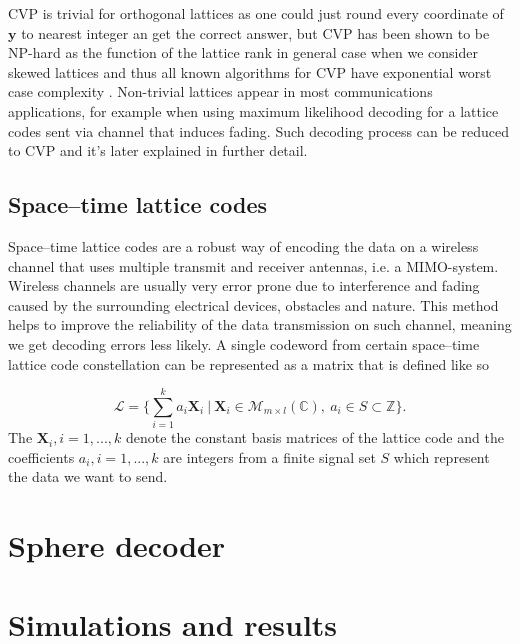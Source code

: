 \documentclass[english,12pt,a4paper,pdftex,sci,utf8]{aaltothesis}
\begin{document}
CVP is trivial for orthogonal lattices as one could just round every coordinate of $\mathbf{y}$ to nearest integer an get the correct answer, but CVP has been shown to be NP-hard as the function of the lattice rank in general case when we consider skewed lattices and thus all known algorithms for CVP have exponential worst case complexity \cite{agrell}. Non-trivial lattices appear in most communications applications, for example when using maximum likelihood decoding for a lattice codes sent via channel that induces fading. Such decoding process can be reduced to CVP and it's later explained in further detail.

\subsection{Space--time lattice codes}

Space--time lattice codes are a robust way of encoding the data on a  wireless channel that uses multiple transmit and receiver antennas, i.e. a MIMO-system. Wireless channels are usually very error prone due to interference and fading caused by the surrounding electrical devices, obstacles and nature. This method helps to improve the reliability of the data transmission on such channel, meaning we get decoding errors less likely. A single codeword from certain space--time lattice code constellation can be represented as a matrix that is defined like so

\begin{equation}
\mathcal{L} = \Bigg\{\sum_{i=1}^k a_i\mathbf{X}_i \ \Big| \ \mathbf{X}_i \in \mathcal{M}_{m \times l}(\mathbb{C}), \ a_i \in S \subset \mathbb{Z} \Bigg\}.
\label{eq:codeword}
\end{equation}
The $\mathbf{X}_i, i = 1,...,k$ denote the constant basis matrices of the lattice code and the coefficients $a_i, i = 1,...,k$ are integers from a finite signal set $S$ which represent the data we want to send.



\clearpage

\section{Sphere decoder}

\clearpage

\section{Simulations and results}
 
\end{document}
